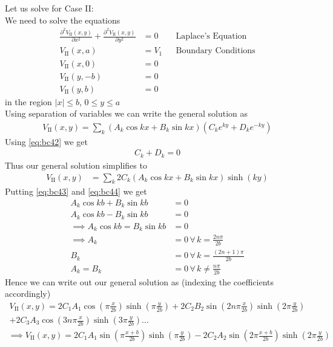 \documentclass[../main.tex]{subfiles}
\begin{document}
\begin{questions}
\begin{solution}
		Let us solve for Case II:\\
		We need to solve the equations
		\begin{align}
			\frac{\partial^2 V_\text{II}(x,y)}{\partial x^2} + \frac{\partial^2 V_\text{II}(x,y)}{\partial y^2} &= 0 && \text{Laplace's Equation}\\
			V_\text{II}(x,a) &= V_1 && \text{Boundary Conditions}\label{eq:bc41}\\
			V_\text{II}(x,0) &= 0\label{eq:bc42}\\
			V_\text{II}(y,-b) &= 0\label{eq:bc43}\\
			V_\text{II}(y,b) &= 0\label{eq:bc44}
		\end{align}
		in the region $|x| \leq b$, $0\leq y\leq a$\\
		Using separation of variables we can write the general solution as
		\begin{align}
			V_\text{II}(x,y) = \sum_k (A_k\cos kx + B_k \sin kx)(C_k e^{ky} + D_k e^{-ky})
		\end{align}
		Using \eqref{eq:bc42} we get
		\begin{align}
			C_k + D_k = 0
		\end{align}
		Thus our general solution simplifies to
		\begin{align}
			V_\text{II}(x,y) &= \sum_k 2C_k(A_k\cos kx + B_k \sin kx)\sinh(ky)
		\end{align}
		Putting \eqref{eq:bc43} and \eqref{eq:bc44} we get
		\begin{align}
			A_k\cos kb + B_k \sin kb &= 0\\
			A_k\cos kb - B_k \sin kb &= 0\\
			\implies A_k \cos kb = B_k \sin kb &= 0\\
			\implies A_k &= 0\, \forall\, k = \frac{2n\pi}{2b}\\
			B_k &= 0\,\forall\, k = \frac{(2n+1)\pi}{2b}\\
			A_k = B_k &= 0 \,\forall \, k \neq \frac{n\pi}{2b}
		\end{align}
		Hence we can write out our general solution as (indexing the coefficients accordingly)
		\begin{align}
			V_\text{II}(x,y) = 2C_1A_1 \cos(\pi\frac{x}{2b})\sinh(\pi\frac{y}{2b}) + 2C_2B_2 \sin(2n\pi\frac{x}{2b})\sinh(2\pi\frac{y}{2b}) \\
			+ 2C_3A_3 \cos(3n\pi\frac{x}{2b})\sinh(3\pi\frac{y}{2b})\dots
		\end{align}
		\begin{align}
			\implies V_\text{II}(x,y) = 2C_1A_1\sin(\pi\frac{x+b}{2b})\sinh(\pi\frac{y}{2b}) - 2C_2A_2\sin(2\pi\frac{x+b}{2b})\sinh(2\pi\frac{y}{2b})\\

\end{align}
\end{solution}
\end{questions}
\end{document}
